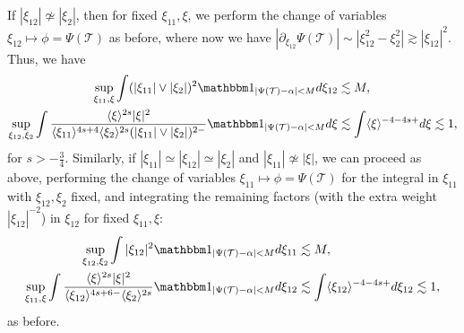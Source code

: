 \documentclass[a4paper,
11pt,  reqno]{amsart}
\newcommand{\5}{\textup{V}}
\newcommand{\ind}{\mathbbm 1}
\newcommand{\les}{\lesssim}
\theoremstyle{remark}
\newcommand{\TT}{\mathcal{T}}
\newcommand{\al}{\alpha}
\newcommand{\ges}{\gtrsim}
\newcommand{\jb}[1]
{\langle #1 \rangle}
\numberwithin{equation}{section}
\numberwithin{theorem}{section}
\begin{document}
If $|\xi_{12}| \not \simeq |\xi_2|$, then for fixed $\xi_{11}, \xi$, we perform the change of variables $\xi_{12} \mapsto \phi = \Psi(\TT)$ as before, where now we have
$|\partial_{\xi_{12}} \Psi(\TT) | \sim |\xi_{12}^2 - \xi_2^2| \ges |\xi_{12}|^2$.
Thus, we have
\begin{align}
    \sup_{\xi_{11}, \xi} \int
(|\xi_{11}| \lor |\xi_2|)^2 \ind_{|\Psi(\TT) - \al| < M } d \xi_{12}
    &
    \les M
    ,
    \\
    \sup_{\xi_{12}, \xi_2}
    \int
    \frac{\jb{\xi}^{2s} |\xi|^2 }{\jb{\xi_{11}}^{4s+4} \jb{\xi_2}^{2s} (|\xi_{11}| \lor |\xi_2|)^{2-}} \ind_{|\Psi(\TT) - \al| < M }
    d\xi
    &
    \les \int \jb{\xi}^{-4-4s+} d\xi \les 1 ,
\end{align}
for $s>-\frac34$.
Similarly,
if $|\xi_{11}|\simeq |\xi_{12}| \simeq |\xi_2|$ and $|\xi_{11}| \not \simeq |\xi|$, we can proceed as above, performing the change of variables $\xi_{11} \mapsto \phi = \Psi(\TT)$ for the integral in $\xi_{11}$ with $\xi_{12},\xi_2$ fixed, and integrating the remaining factors (with the extra weight $|\xi_{12}|^{-2}$) in $\xi_{12}$ for fixed $\xi_{11},\xi$:
\begin{align}
    \sup_{\xi_{12}, \xi_2} \int |\xi_{12}|^2 \ind_{|\Psi(\TT) - \al| < M } d\xi_{11}
    & \les M
    ,
    \\
    \sup_{\xi_{11}, \xi} \int \frac{\jb{\xi}^{2s} |\xi|^2 }{\jb{\xi_{12}}^{4s+6 -} \jb{\xi_2}^{2s}} \ind_{|\Psi(\TT) - \al| < M } d\xi_{12 }
    &
    \les
    \int \jb{\xi_{12}}^{-4-4s+} d\xi_{12} \les 1,
\end{align}
as before.
\end{document}
